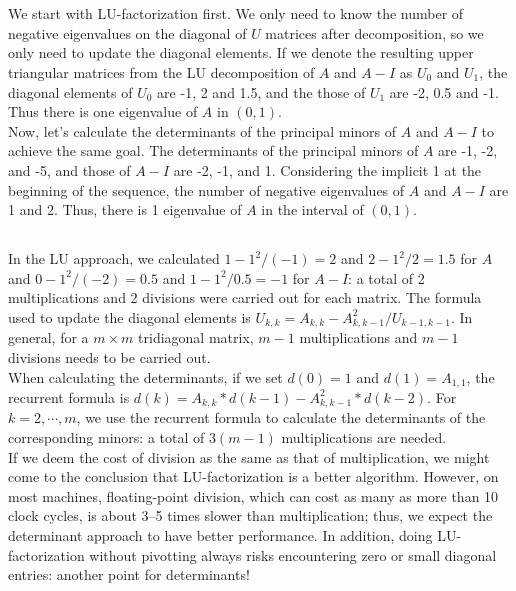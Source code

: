 \documentclass[11pt]{article}
\begin{document}
\maketitle
\section{}
\subsection{}
We start with LU-factorization first. We only need to know the number of negative eigenvalues on the diagonal of $U$ matrices after decomposition, so we only need to update the diagonal elements. If we denote the resulting upper triangular matrices from the LU decomposition of $A$ and $A-I$ as $U_0$ and $U_1$, the diagonal elements of $U_0$ are -1, 2 and 1.5, and the those of $U_1$ are -2, 0.5 and -1. Thus there is one eigenvalue of $A$ in $(0,1)$.\\[0.3cm]
Now, let's calculate the determinants of the principal minors of $A$ and $A-I$ to achieve the same goal. The determinants of the principal minors of $A$ are -1, -2, and -5, and those of $A-I$ are -2, -1, and 1. Considering the implicit 1 at the beginning of the sequence, the number of negative eigenvalues of $A$ and $A-I$ are 1 and 2. Thus, there is 1 eigenvalue of $A$ in the interval of $(0,1)$.

\subsection{}
In the LU approach, we calculated $1 - 1^2/(-1) = 2$ and $2 - 1^2/2 = 1.5$ for $A$ and $0-1^2/(-2) = 0.5$ and $1-1^2/0.5 = -1$ for $A-I$: a total of 2 multiplications and 2 divisions were carried out for each matrix. The formula used to update the diagonal elements is $U_{k,k} = A_{k,k} - A_{k,k-1}^2/U_{k-1,k-1}.$ In general, for a $m\times m$ tridiagonal matrix, $m-1$ multiplications and $m-1$ divisions needs to be carried out.\\[0.3cm]
When calculating the determinants, if we set $d(0)=1$ and $d(1)=A_{1,1}$, the recurrent formula is $d(k) = A_{k,k}*d(k-1)-A_{k,k-1}^2*d(k-2)$. For $k=2,\cdots,m$, we use the recurrent formula to calculate the determinants of the corresponding minors: a total of $3(m-1)$ multiplications are needed.\\[0.3cm]
If we deem the cost of division as the same as that of multiplication, we might come to the conclusion that LU-factorization is a better algorithm. However, on most machines, floating-point division, which can cost as many as more than 10 clock cycles, is about 3--5 times slower than multiplication; thus, we expect the determinant approach to have better performance. In addition, doing LU-factorization without pivotting always risks encountering zero or small diagonal entries: another point for determinants!
\end{document}
